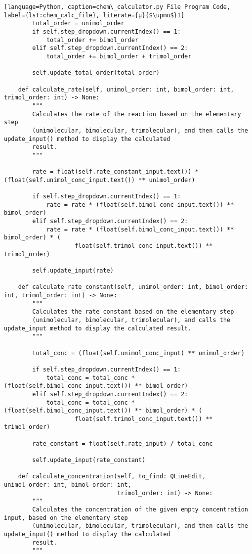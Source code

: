 \begin{lstlisting}[language=Python, caption=chem\_calculator.py File Program Code, label={lst:chem_calc_file}, literate={μ}{$\upmu$}1]
        total_order = unimol_order
        if self.step_dropdown.currentIndex() == 1:
            total_order += bimol_order
        elif self.step_dropdown.currentIndex() == 2:
            total_order += bimol_order + trimol_order

        self.update_total_order(total_order)

    def calculate_rate(self, unimol_order: int, bimol_order: int, trimol_order: int) -> None:
        """
        Calculates the rate of the reaction based on the elementary step
        (unimolecular, bimolecular, trimolecular), and then calls the update_input() method to display the calculated
        result.
        """

        rate = float(self.rate_constant_input.text()) * (float(self.unimol_conc_input.text()) ** unimol_order)

        if self.step_dropdown.currentIndex() == 1:
            rate = rate * (float(self.bimol_conc_input.text()) ** bimol_order)
        elif self.step_dropdown.currentIndex() == 2:
            rate = rate * (float(self.bimol_conc_input.text()) ** bimol_order) * (
                    float(self.trimol_conc_input.text()) ** trimol_order)

        self.update_input(rate)

    def calculate_rate_constant(self, unimol_order: int, bimol_order: int, trimol_order: int) -> None:
        """
        Calculates the rate constant based on the elementary step
        (unimolecular, bimolecular, trimolecular), and calls the update_input method to display the calculated result.
        """

        total_conc = (float(self.unimol_conc_input) ** unimol_order)

        if self.step_dropdown.currentIndex() == 1:
            total_conc = total_conc * (float(self.bimol_conc_input.text()) ** bimol_order)
        elif self.step_dropdown.currentIndex() == 2:
            total_conc = total_conc * (float(self.bimol_conc_input.text()) ** bimol_order) * (
                    float(self.trimol_conc_input.text()) ** trimol_order)

        rate_constant = float(self.rate_input) / total_conc

        self.update_input(rate_constant)

    def calculate_concentration(self, to_find: QLineEdit, unimol_order: int, bimol_order: int,
                                trimol_order: int) -> None:
        """
        Calculates the concentration of the given empty concentration input, based on the elementary step
        (unimolecular, bimolecular, trimolecular), and then calls the update_input() method to display the calculated
        result.
        """


\end{lstlisting}
